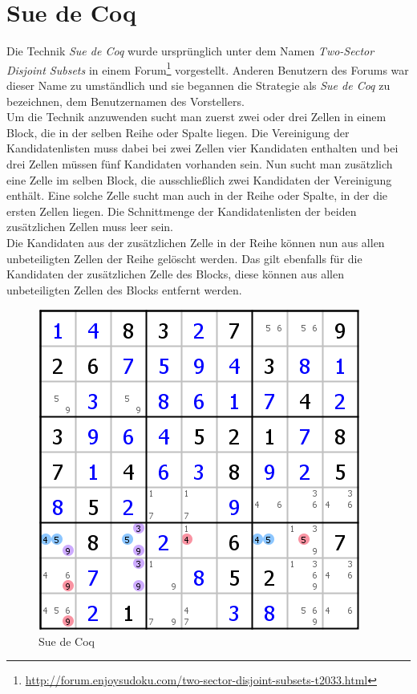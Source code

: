 \newpage
\section{Sue de Coq}
Die Technik \textit{Sue de Coq} wurde ursprünglich unter dem Namen \textit{Two-Sector Disjoint Subsets} in einem Forum\footnote{\url{http://forum.enjoysudoku.com/two-sector-disjoint-subsets-t2033.html}} vorgestellt. Anderen Benutzern des Forums war dieser Name zu umständlich und sie begannen die Strategie als \textit{Sue de Coq} zu bezeichnen, dem Benutzernamen des Vorstellers.\\
Um die Technik anzuwenden sucht man zuerst zwei oder drei Zellen in einem Block, die in der selben Reihe oder Spalte liegen. Die Vereinigung der Kandidatenlisten muss dabei bei zwei Zellen vier Kandidaten enthalten und bei drei Zellen müssen fünf Kandidaten vorhanden sein. Nun sucht man zusätzlich eine Zelle im selben Block, die ausschließlich zwei Kandidaten der Vereinigung enthält. Eine solche Zelle sucht man auch in der Reihe oder Spalte, in der die ersten Zellen liegen. Die Schnittmenge der Kandidatenlisten der beiden zusätzlichen Zellen muss leer sein. \\
Die Kandidaten aus der zusätzlichen Zelle in der Reihe können nun aus allen unbeteiligten Zellen der Reihe gelöscht werden.  Das gilt ebenfalls für die Kandidaten der zusätzlichen Zelle des Blocks, diese können aus allen unbeteiligten Zellen des Blocks entfernt werden.\\

\begin{figure}[h]
\begin{center}
\includegraphics{./img/Sue_de_Coq.png}
\caption{Sue de Coq}
\end{center}
\end{figure}

